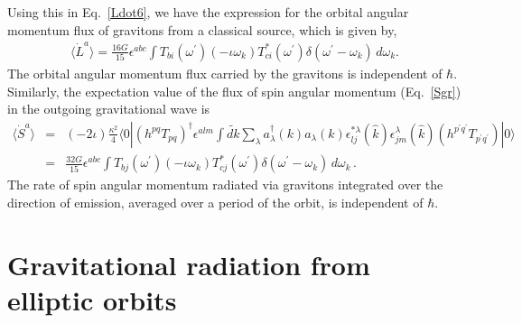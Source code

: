 \documentclass[aps,prd]{revtex4-2}
\begin{document}
Using this in Eq.~\eqref{Ldot6}, we have the expression for the orbital angular momentum flux of gravitons from a classical source, which is given by,
\begin{eqnarray}\label{dLdt-1}
\langle   \dot L^a\rangle= \frac{16G}{15}\epsilon^{abc} \int T_{bi}(\omega^\prime)\left(-\iota\omega_{k}\right)T^{*}_{ci}(\omega^\prime)\delta(\omega^\prime-\omega_k)\, d\omega_{k}.
\end{eqnarray}
The orbital angular momentum flux carried by the gravitons is independent of $\hbar$. Similarly, the expectation  value of the flux of spin angular momentum  (Eq.~\eqref{Sgr}) in the outgoing gravitational wave is
\begin{eqnarray}\label{dSdt-1}
    \langle \dot S^a \rangle &=& \left(-2\iota\right)\frac{\kappa^2}{4}\langle 0| (h^{pq}T_{pq})^\dagger \epsilon^{alm} \int \widetilde {dk} \sum_{\lambda}  a_{\lambda}^\dagger(k) a_{\lambda} (k) \epsilon^{*\lambda}_{lj}(\hat k)\epsilon_{jm}^{\lambda}(\hat k)\left(h^{p^\prime q^\prime}T_{p^\prime q^\prime}\right)|0 \rangle\nonumber\\
    &=& \frac{32G}{15} \epsilon^{abc} \int T_{bj}({\omega}^{\prime})\left(-\iota{\omega}_{k}\right)T^*_{cj}({\omega}^{\prime})\delta({\omega}^{\prime}-{\omega}_{k}) \, d{\omega}_{k}\,.
\end{eqnarray}
The rate of spin angular momentum radiated via gravitons integrated over the direction of emission, averaged over a period of the orbit, is independent of $\hbar$. 


\section{Gravitational radiation from elliptic orbits}\label{Sec:Elliptic_Gravity}
\end{document}
